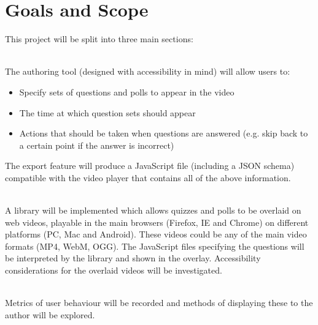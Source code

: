 \section{Goals and Scope} 
\label{Section:Goals and Scope}
This project will be split into three main sections:
\begin{description}[%
  before={\setcounter{descriptcount}{0}},%
  ,font=\bfseries\stepcounter{descriptcount}\thedescriptcount~]
\item[Quiz Authoring Tool] \hfill \\
The authoring tool (designed with accessibility in mind) will allow users to:
\begin{itemize}
\item Specify sets of questions and polls to appear in the video
\item The time at which question sets should appear
\item Actions that should be taken when questions are answered (e.g. skip back to a certain point if the answer is incorrect)
\end{itemize}

The export feature will produce a JavaScript file (including a JSON schema) compatible with the video player that contains all of the above information.

\item[Overlaid Video Player] \hfill \\
A library will be implemented which allows quizzes and polls to be overlaid on web videos, playable in the main browsers (Firefox, IE and Chrome) on different platforms (PC, Mac and Android). These videos could be any of the main video formats (MP4, WebM, OGG). The JavaScript files specifying the questions will be interpreted by the library and shown in the overlay. Accessibility considerations for the overlaid videos will be investigated.
\item[Video and Quiz Analytics] \hfill \\
Metrics of user behaviour will be recorded and methods of displaying these to the author will be explored.
\end{description}